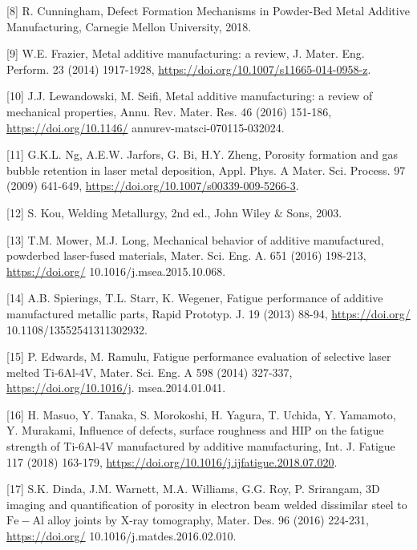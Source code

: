 \documentclass[10pt]{article}
\begin{document}
[8] R. Cunningham, Defect Formation Mechanisms in Powder-Bed Metal Additive Manufacturing, Carnegie Mellon University, 2018.

[9] W.E. Frazier, Metal additive manufacturing: a review, J. Mater. Eng. Perform. 23 (2014) 1917-1928, \href{https://doi.org/10.1007/s11665-014-0958-z}{https://doi.org/10.1007/s11665-014-0958-z}.

[10] J.J. Lewandowski, M. Seifi, Metal additive manufacturing: a review of mechanical properties, Annu. Rev. Mater. Res. 46 (2016) 151-186, \href{https://doi.org/10.1146/}{https://doi.org/10.1146/} annurev-matsci-070115-032024.

[11] G.K.L. Ng, A.E.W. Jarfors, G. Bi, H.Y. Zheng, Porosity formation and gas bubble retention in laser metal deposition, Appl. Phys. A Mater. Sci. Process. 97 (2009) 641-649, \href{https://doi.org/10.1007/s00339-009-5266-3}{https://doi.org/10.1007/s00339-009-5266-3}.

[12] S. Kou, Welding Metallurgy, 2nd ed., John Wiley \& Sons, 2003.

[13] T.M. Mower, M.J. Long, Mechanical behavior of additive manufactured, powderbed laser-fused materials, Mater. Sci. Eng. A. 651 (2016) 198-213, \href{https://doi.org/}{https://doi.org/} 10.1016/j.msea.2015.10.068.

[14] A.B. Spierings, T.L. Starr, K. Wegener, Fatigue performance of additive manufactured metallic parts, Rapid Prototyp. J. 19 (2013) 88-94, \href{https://doi.org/}{https://doi.org/} 10.1108/13552541311302932.

[15] P. Edwards, M. Ramulu, Fatigue performance evaluation of selective laser melted Ti-6Al-4V, Mater. Sci. Eng. A 598 (2014) 327-337, \href{https://doi.org/10.1016/j}{https://doi.org/10.1016/j}. msea.2014.01.041.

[16] H. Masuo, Y. Tanaka, S. Morokoshi, H. Yagura, T. Uchida, Y. Yamamoto, Y. Murakami, Influence of defects, surface roughness and HIP on the fatigue strength of Ti-6Al-4V manufactured by additive manufacturing, Int. J. Fatigue 117 (2018) 163-179, \href{https://doi.org/10.1016/j.ijfatigue.2018.07.020}{https://doi.org/10.1016/j.ijfatigue.2018.07.020}.

[17] S.K. Dinda, J.M. Warnett, M.A. Williams, G.G. Roy, P. Srirangam, 3D imaging and quantification of porosity in electron beam welded dissimilar steel to $\mathrm{Fe}-\mathrm{Al}$ alloy joints by X-ray tomography, Mater. Des. 96 (2016) 224-231, \href{https://doi.org/}{https://doi.org/} 10.1016/j.matdes.2016.02.010.
\end{document}
